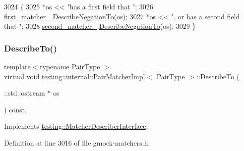 \begin{DoxyCode}
3024                                                         \{
3025     *os << \textcolor{stringliteral}{"has a first field that "};
3026     \hyperlink{classtesting_1_1internal_1_1PairMatcherImpl_a70e5a952ffd16886f5f1bacc718561f8}{first\_matcher\_}.\hyperlink{classtesting_1_1internal_1_1MatcherBase_ac1089d49b6b8a381900618985cd69b7f}{DescribeNegationTo}(os);
3027     *os << \textcolor{stringliteral}{", or has a second field that "};
3028     \hyperlink{classtesting_1_1internal_1_1PairMatcherImpl_a2341ad72afa02dcadb98c531cada3576}{second\_matcher\_}.\hyperlink{classtesting_1_1internal_1_1MatcherBase_ac1089d49b6b8a381900618985cd69b7f}{DescribeNegationTo}(os);
3029   \}
\end{DoxyCode}
\mbox{\label{classtesting_1_1internal_1_1PairMatcherImpl_ad4b5139aa8a3cdcc178c9d81b98d95f0}} 
\subsubsection{\texorpdfstring{Describe\+To()}{DescribeTo()}}
{\footnotesize\ttfamily template$<$typename Pair\+Type $>$ \\
virtual void \hyperlink{classtesting_1_1internal_1_1PairMatcherImpl}{testing\+::internal\+::\+Pair\+Matcher\+Impl}$<$ Pair\+Type $>$\+::Describe\+To (\begin{DoxyParamCaption}\item[{\+::std\+::ostream $\ast$}]{os }\end{DoxyParamCaption}) const\hspace{0.3cm}{\ttfamily [inline]}, {\ttfamily [virtual]}}



Implements \hyperlink{classtesting_1_1MatcherDescriberInterface_ad9f861588bd969b6e3e717f13bb94e7b}{testing\+::\+Matcher\+Describer\+Interface}.



Definition at line 3016 of file gmock-\/matchers.\+h.


